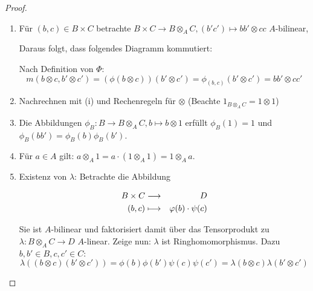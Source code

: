 \documentclass[12pt,a4paper]{scrartcl}
\theoremstyle{cplain}
\theoremstyle{cdef}
\begin{document}
\begin{proof}
	\leavevmode
	\begin{enumerate}
		\item Für $(b,c)\in B\times C$ betrachte $B\times C\to B\otimes_AC, (b'c')\longmapsto bb'\otimes cc$ $A$-bilinear,
		\begin{center}
		\end{center}
		Daraus folgt, dass folgendes Diagramm kommutiert:
			\begin{center}
			\end{center}
		
		Nach Definition von $\Phi$:
		$$m(b\otimes c, b'\otimes c') = (\phi(b\otimes c))(b'\otimes c') = \phi_{(b,c)}(b'\otimes c') = bb'\otimes cc'$$
		\item Nachrechnen mit (i) %
			und Rechenregeln für $\otimes$ (Beachte $1_{B\otimes_AC}= 1\otimes 1$)
		\item Die Abbildungen $\phi_B\colon B\to B\otimes_AC, b\mapsto b\otimes 1$ erfüllt $\phi_B(1) = 1$ und $\phi_B(bb') =\phi_B(b)\phi_B(b')$.
		\item Für $a\in A$ gilt: $a\otimes_A1 = a\cdot(1\otimes_A1) = 1\otimes_A a$.
		\item Existenz von $\lambda$: Betrachte die Abbildung
		
		\begin{eqnarray*}
			B\times C &\longrightarrow & D\\
			(b,c) &\longmapsto &\varphi(b)\cdot \psi(c)
		\end{eqnarray*}
	
		\noindent
		Sie ist $A$-bilinear und faktorisiert damit über das Tensorprodukt zu $\lambda\colon B\otimes_AC\to D$ $A$-linear. Zeige nun: $\lambda$ ist Ringhomomorphismus. Dazu $b,b'\in B, c,c'\in C$:
		$$\lambda((b\otimes c)(b'\otimes c')) = \phi(b)\phi(b')\psi(c)\psi(c') = \lambda(b\otimes c)\lambda (b'\otimes c')$$
		

\end{enumerate}
\end{proof}
\end{document}

